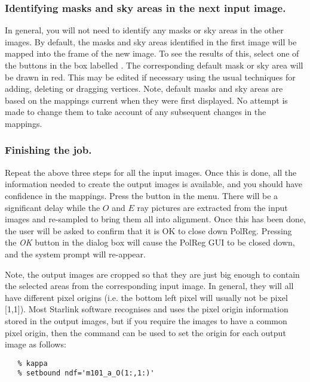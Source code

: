 \subsubsection {Identifying masks and sky areas in the next input image.}
In general, you will not need to identify any masks or sky areas in the
other images. By default, the masks and sky areas identified in the first
image will be mapped into the frame of the new image. To see the results
of this, select one of the buttons in the box labelled
. The corresponding default mask
or sky area will be drawn in red. This may be edited if necessary using the
usual techniques for adding, deleting or dragging vertices. Note, 
default masks and sky areas are based on the mappings current when they
were first displayed. No attempt is made to change them to take
account of any subsequent changes in the mappings.

\subsubsection {Finishing the job.}
Repeat the above three steps for all the input images. Once this is done,
all the information needed to create the output images is available, and
you should have confidence in the mappings. Press the  button in the 
menu. There will be a significant delay while the $O$ and $E$ ray
pictures are extracted from the input images and re-sampled to bring them
all into alignment. Once this has been done, the user will be asked to
confirm that it is OK to close down PolReg. Pressing the {\em OK} button
in the dialog box will cause the PolReg GUI to be closed down, and the 
system prompt will re-appear.

Note, the output images are cropped so that they are just big enough to
contain the selected areas from the corresponding input image. In
general, they will all have different pixel origins (i.e. the bottom left
pixel will usually not be pixel [1,1]). Most Starlink software recognises
and uses the pixel origin information stored in the output images, but if
you require the images to have a common pixel origin, then the
 command 
can be used to set the origin for each output image as follows:

\begin{verbatim}
   % kappa
   % setbound ndf='m101_a_O(1:,1:)' 
\end{verbatim}

